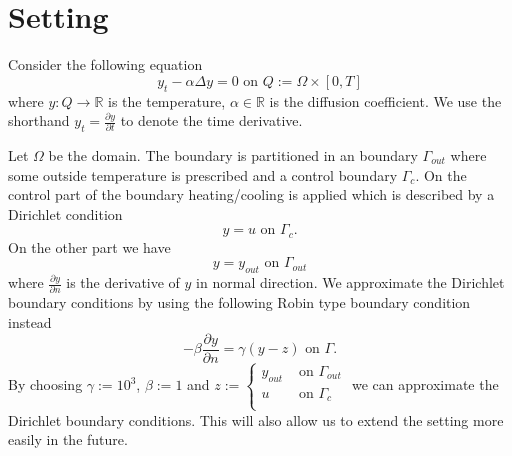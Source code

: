 \documentclass[
12pt, %
a4paper, %
onecolumn, %
portrait %
]{article}
\begin{document}
\pagestyle{myheadings} %
\markright{\doctitle} %


\thispagestyle{plain} %

\printtitle %

\section{Setting}
Consider the following equation
\begin{equation}
y_t -  \alpha \Delta y = 0 \text{ on } Q := \Omega \times [0,T]
\label{eq:pde}
\end{equation}
where $y : Q \rightarrow \mathbb{R}$ is the temperature, $\alpha \in \mathbb{R}$ is the diffusion coefficient. We use the shorthand $y_t = \frac{\partial y}{\partial t}$ to denote the time derivative.
 
Let $\Omega$ be the domain. The boundary is partitioned in an boundary $\Gamma_{out}$ where some outside temperature is prescribed and a control boundary $\Gamma_c$. On the control part of the boundary heating/cooling is applied which is described by a Dirichlet condition
\begin{equation}
y = u \text{ on } \Gamma_c.
\end{equation}
On the other part we have
\begin{equation}
y = y_{out} \text{ on } \Gamma_{out}
\end{equation}
where $\frac{\partial y}{\partial n}$ is the derivative of $y$ in normal direction.
We approximate the Dirichlet boundary conditions by using the following Robin type boundary condition instead
\begin{equation}
- \beta \frac{\partial y}{\partial n} = \gamma (y - z) \text{ on } \Gamma.
\label{eq:robin-bc}
\end{equation}
By choosing 
$\gamma := 10^3$, $\beta := 1$
and
$z := \begin{cases}
y_{out} &\text{ on } \Gamma_{out} \\ 
u &\text{ on } \Gamma_c \\
\end{cases}
$
we can approximate the Dirichlet boundary conditions. This will also allow us to extend the setting more easily in the future.
\end{document}
